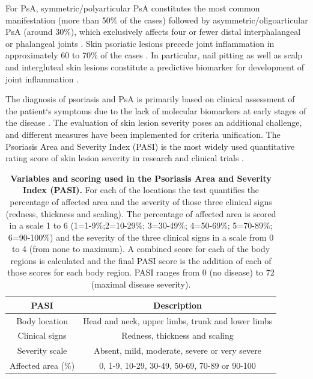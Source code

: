 For PsA, symmetric/polyarticular PsA constitutes the most common manifestation (more than 50\% of the cases) followed by asymmetric/oligoarticular PsA (around 30\%), which exclusively affects four or fewer distal interphalangeal or phalangeal joints \parencite{Reich2009, McGonagle2011}. Skin psoriatic lesions precede joint inflammation in approximately 60 to 70\% of the cases \parencite{Gladman2005, McGonagle2011}. In particular, nail pitting as well as scalp and intergluteal skin lesions constitute a predictive biomarker for development of joint inflammation \parencite{Moll1973,Griffiths2007,McGonagle2011}.

The diagnosis of psoriasis and PsA is primarily based on clinical assessment of the patient`s symptoms due to the lack of molecular biomarkers at early stages of the disease \parencite{Villanova2013}. The evaluation of skin lesion severity poses an additional challenge, and different measures have been implemented for criteria unification. The Psoriasis Area and Severity Index (PASI) is the most widely used quantitative rating score of skin lesion severity in research and clinical trials \parencite{Fredriksson1978,Finlay2005}. 


\begin{table}[htbp]
\centering
\setlength{\tabcolsep}{20pt}
\renewcommand{\arraystretch}{1.0}
\begin{tabular}{@{} c c}
\toprule
\textbf{PASI} & \textbf{Description} \\
\midrule
\midrule
Body location  & Head and neck, upper limbs, trunk and lower limbs\\
Clinical signs & Redness, thickness and scaling \\
Severity scale & Absent, mild, moderate, severe or very severe \\
Affected area (\%)  & 0, 1-9, 10-29, 30-49, 50-69, 70-89 or 90-100 \\
\bottomrule
\end{tabular}
\medskip %
\caption[Variables and scoring used in the Psoriasis Area and Severity Index (PASI)]{\textbf{Variables and scoring used in the Psoriasis Area and Severity Index (PASI).} For each of the locations the test quantifies the percentage of affected area and the severity of those three clinical signs (redness, thickness and scaling). The percentage of affected area is scored in a scale 1 to 6 (1=1-9\%;2=10-29\%; 3=30-49\%; 4=50-69\%; 5=70-89\%; 6=90-100\%) and the severity of
the three clinical signs in a scale from 0 to 4 (from none to maximum). A combined score for each of the body regions is calculated %
and the final PASI score is the addition of each of those scores for each body region. PASI ranges from 0 (no disease) to 72 (maximal disease severity).}
\label{tab:PASI}
\end{table}
\smallskip %

